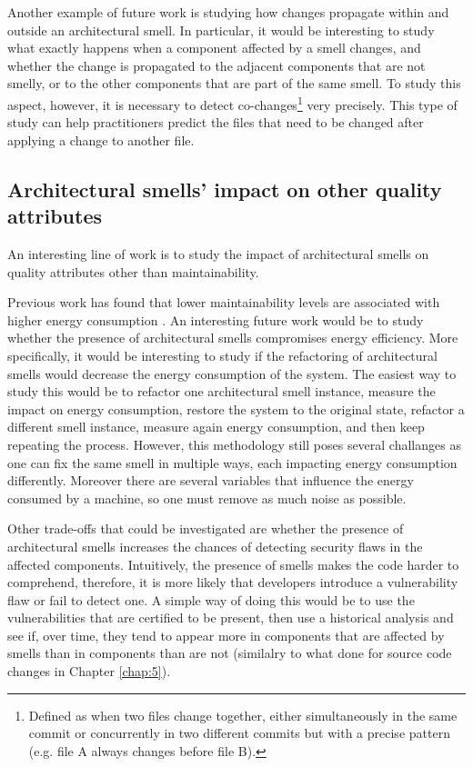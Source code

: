 Another example of future work is studying how changes propagate within and outside an architectural smell.
In particular, it would be interesting to study what exactly happens when a component affected by a smell changes, and whether the change is propagated to the adjacent components that are not smelly, or to the other components that are part of the same smell.
To study this aspect, however, it is necessary to detect co-changes\footnote{Defined as when two files change together, either simultaneously in the same commit or concurrently in two different commits but with a precise pattern (e.g. file A always changes before file B).} very precisely.
This type of study can help practitioners predict the files that need to be changed after applying a change to another file.

\subsection{Architectural smells' impact on other quality attributes}
An interesting line of work is to study the impact of architectural smells on quality attributes other than maintainability.

Previous work has found that lower maintainability levels are associated with higher energy consumption \cite{Papadopoulos2018}.
An interesting future work would be to study whether the presence of architectural smells compromises energy efficiency.
More specifically, it would be interesting to study if the refactoring of architectural smells would decrease the energy consumption of the system.
The easiest way to study this would be to refactor one architectural smell instance, measure the impact on energy consumption, restore the system to the original state, refactor a different smell instance, measure again energy consumption, and then keep repeating the process.
However, this methodology still poses several challanges as one can fix the same smell in multiple ways, each impacting energy consumption differently.
Moreover there are several variables that influence the energy consumed by a machine, so one must remove as much noise as possible.

Other trade-offs that could be investigated are whether the presence of architectural smells increases the chances of detecting security flaws in the affected components.
Intuitively, the presence of smells makes the code harder to comprehend, therefore, it is more likely that developers introduce a vulnerability flaw or fail to detect one. 
A simple way of doing this would be to use the vulnerabilities that are certified to be present, then use a historical analysis and see if, over time, they tend to appear more in components that are affected by smells than in components than are not (similalry to what done for source code changes in Chapter \ref{chap:5}).

